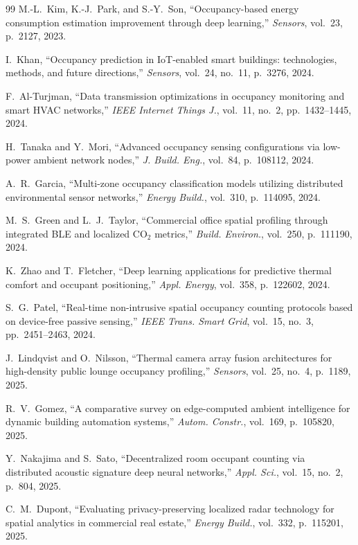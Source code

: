 \begin{thebibliography}{99}
M.-L.~Kim, K.-J.~Park, and S.-Y.~Son, ``Occupancy-based energy consumption estimation improvement through deep learning,'' \textit{Sensors}, vol.~23, p.~2127, 2023.

I.~Khan, ``Occupancy prediction in IoT-enabled smart buildings: technologies, methods, and future directions,'' \textit{Sensors}, vol.~24, no.~11, p.~3276, 2024.

F.~Al-Turjman, ``Data transmission optimizations in occupancy monitoring and smart HVAC networks,'' \textit{IEEE Internet Things J.}, vol.~11, no.~2, pp.~1432--1445, 2024.

H.~Tanaka and Y.~Mori, ``Advanced occupancy sensing configurations via low-power ambient network nodes,'' \textit{J. Build. Eng.}, vol.~84, p.~108112, 2024.

A.~R.~Garcia, ``Multi-zone occupancy classification models utilizing distributed environmental sensor networks,'' \textit{Energy Build.}, vol.~310, p.~114095, 2024.

M.~S.~Green and L.~J.~Taylor, ``Commercial office spatial profiling through integrated BLE and localized CO$_2$ metrics,'' \textit{Build. Environ.}, vol.~250, p.~111190, 2024.

K.~Zhao and T.~Fletcher, ``Deep learning applications for predictive thermal comfort and occupant positioning,'' \textit{Appl. Energy}, vol.~358, p.~122602, 2024.

S.~G.~Patel, ``Real-time non-intrusive spatial occupancy counting protocols based on device-free passive sensing,'' \textit{IEEE Trans. Smart Grid}, vol.~15, no.~3, pp.~2451--2463, 2024.

J.~Lindqvist and O.~Nilsson, ``Thermal camera array fusion architectures for high-density public lounge occupancy profiling,'' \textit{Sensors}, vol.~25, no.~4, p.~1189, 2025.

R.~V.~Gomez, ``A comparative survey on edge-computed ambient intelligence for dynamic building automation systems,'' \textit{Autom. Constr.}, vol.~169, p.~105820, 2025.

Y.~Nakajima and S.~Sato, ``Decentralized room occupant counting via distributed acoustic signature deep neural networks,'' \textit{Appl. Sci.}, vol.~15, no.~2, p.~804, 2025.

C.~M.~Dupont, ``Evaluating privacy-preserving localized radar technology for spatial analytics in commercial real estate,'' \textit{Energy Build.}, vol.~332, p.~115201, 2025.


\end{thebibliography}
